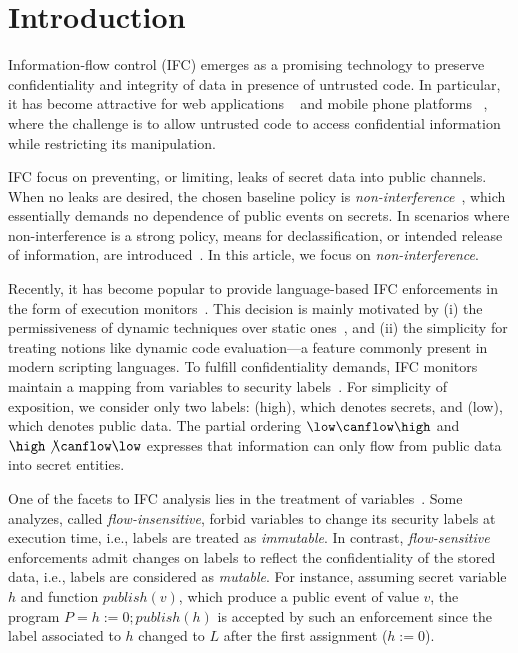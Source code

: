 \section{Introduction}
\label{sec:intro}

Information-flow control (IFC) emerges as a promising technology to preserve
confidentiality and integrity of data in presence of untrusted code.  In
particular, it has become attractive for web applications
~\citep[e.g.][]{DeGroef:2012:FWB:2382196.2382275, giffin:hails,
  yang:2013:towards, conf/esorics/AkhaweLHSS13, Hedin13} and mobile phone
platforms ~\citep[e.g.][]{Enck:2010,android:esorics13}, where the challenge is
to allow untrusted code to access confidential information while restricting its
manipulation.

IFC focus on preventing, or limiting, leaks of secret data into public
channels. When no leaks are desired, the chosen baseline policy is
\emph{non-interference}~\citep{Goguen:Meseguer:Noninterference}, which 
essentially demands no dependence of public events on secrets. In scenarios where
non-interference is a strong policy, means for declassification, or intended
release of information, are introduced~\citep{Sabelfeld:Sands:CSFW05}. In this
article, we focus on \emph{non-interference}. 

Recently, it has become popular to provide language-based IFC enforcements in
the form of execution monitors~\citep{Hedin2011}. This decision is mainly
motivated by (i) the permissiveness of dynamic techniques over static
ones~\citep{Sabelfeld:Russo:PSI09}, and (ii) the simplicity for treating notions
like dynamic code evaluation---a feature commonly present in modern scripting
languages. To fulfill confidentiality demands, IFC monitors maintain a
mapping from variables to security labels~\citep{myers:dlm,Stefan:2011}.  For
simplicity of exposition, we consider only two labels: \high (high), which
denotes secrets, and \low (low), which denotes public data. The partial ordering
$\low \canflow \high$ and $\high \not \canflow \low$ expresses that information
can only flow from public data into secret entities.

One of the facets to IFC analysis lies in the treatment of
variables~\citep{Hunt:2006}. Some analyzes, called \emph{flow-insensitive},
forbid variables to change its security labels at execution time, i.e., labels
are treated as \emph{immutable}. In contrast, \emph{flow-sensitive} enforcements
admit changes on labels to reflect the confidentiality of the stored
data, i.e., labels are considered as \emph{mutable}. For instance, assuming secret
variable $h$ and function $\mathit{publish}(v)$, which produce a public event of
value $v$, the program $P = h := 0 ; \mathit{publish}(h)$ is accepted by such an
enforcement since the label associated to $h$ changed to $L$ after the first
assignment ($h := 0$).

